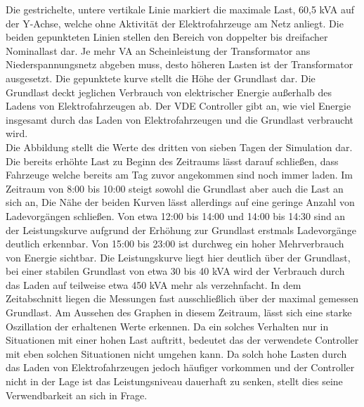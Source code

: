 Die gestrichelte, untere vertikale Linie markiert die maximale Last, 60,5 kVA auf der Y-Achse, welche ohne Aktivität der Elektrofahrzeuge am Netz anliegt. Die beiden gepunkteten Linien stellen den Bereich von doppelter bis dreifacher Nominallast dar. Je mehr VA an Scheinleistung der Transformator ans Niederspannungsnetz abgeben muss, desto höheren Lasten ist der Transformator ausgesetzt. Die gepunktete kurve stellt die Höhe der Grundlast dar. Die Grundlast deckt jeglichen Verbrauch von elektrischer Energie außerhalb des Ladens von Elektrofahrzeugen ab. Der VDE Controller gibt an, wie viel Energie insgesamt durch das Laden von Elektrofahrzeugen und die Grundlast verbraucht wird. \\
Die Abbildung stellt die Werte des dritten von sieben Tagen der Simulation dar. Die bereits erhöhte Last zu Beginn des Zeitraums lässt darauf schließen, dass Fahrzeuge welche bereits am Tag zuvor angekommen sind noch immer laden. Im Zeitraum von 8:00 bis 10:00 steigt sowohl die Grundlast aber auch die Last an sich an, Die Nähe der beiden Kurven lässt allerdings auf eine geringe Anzahl von Ladevorgängen schließen. Von etwa 12:00 bis 14:00 und 14:00 bis 14:30 sind an der Leistungskurve aufgrund der Erhöhung zur Grundlast erstmals Ladevorgänge deutlich erkennbar. Von 15:00 bis 23:00 ist durchweg ein hoher Mehrverbrauch von Energie sichtbar. Die Leistungskurve liegt hier deutlich über der Grundlast, bei einer stabilen Grundlast von etwa 30 bis 40 kVA wird der Verbrauch durch das Laden auf teilweise etwa 450 kVA mehr als verzehnfacht. In dem Zeitabschnitt liegen die Messungen fast ausschließlich über der maximal gemessen Grundlast. Am Aussehen des Graphen in diesem Zeitraum, lässt sich eine starke Oszillation der erhaltenen Werte erkennen. Da ein solches Verhalten nur in Situationen mit einer hohen Last auftritt, bedeutet das der verwendete Controller mit eben solchen Situationen nicht umgehen kann. Da solch hohe Lasten durch das Laden von Elektrofahrzeugen jedoch häufiger vorkommen und der Controller nicht in der Lage ist das Leistungsniveau dauerhaft zu senken, stellt dies seine Verwendbarkeit an sich in Frage. \\
